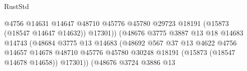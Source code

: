 \begin{lexlean}{RustStd}
\begin{coremodule}
                                                          @4756
                                                          @14631
                                                          @14647
                                                          @48710
                                                          @45776
                                                          @45780
                                                          @29723
                                                          @18191
                                                          (@15873 (@18547 @14647 @14632))
                                                          @17301))
                                                      (@48676
                                                        @3775
                                                        @3887
                                                        @13
                                                        @18
                                                        @14683
                                                        @14743
                                                        (@48684
                                                          @3775
                                                          @13
                                                          @14683
                                                          (@48692
                                                            @567
                                                            @37
                                                            @13
                                                            @4622
                                                            @4756
                                                            @14657
                                                            @14678
                                                            @48710
                                                            @45776
                                                            @45780
                                                            @30248
                                                            @18191
                                                            (@15873 (@18547 @14678 @14658))
                                                            @17301))
                                                        (@48676
                                                          @3724
                                                          @3886
                                                          @13

\end{coremodule}
\end{lexlean}

